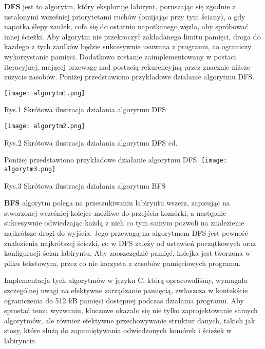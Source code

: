 \documentclass{article}
\begin{document}
\vspace{1mm}

\item \textbf{DFS} jest to algorytm, który eksploruje labirynt, poruszając się zgodnie z ustalonymi wcześniej priorytetami ruchów (omijając przy tym ściany), a gdy napotka ślepy zaułek, cofa się do ostatnio napotkanego węzła, aby spróbować innej ścieżki. Aby algorytm nie przekroczył zakładanego limitu pamięci, droga do każdego z tych zaułków będzie sukcesywnie usuwana z programu, co ograniczy wykorzystanie pamięci. Dodatkowo zostanie zaimplementowany w postaci iteracyjnej, mającej przewagę nad postacią rekurencyjną przez znacznie niższe zużycie zasobów. Poniżej przedstawiono przykładowe działanie algorytmu DFS.

\centering
\texttt{[image: algorytm1.png]}
\caption{Rys.1 Skrótowa ilustracja działania algorytmu DFS}
\restoregeometry

\texttt{[image: algorytm2.png]}
\caption{Rys.2 Skrótowa ilustracja działania algorytmu DFS cd.}
\restoregeometry

Poniżej przedstawiono przykładowe działanie algorytmu DFS.
\texttt{[image: algorytm3.png]}
\caption{Rys.3 Skrótowa ilustracja działania algorytmu BFS}
\restoregeometry

\flushleft

\item \textbf{BFS} algorytm polega na przeszukiwaniu labiryntu wszerz, zapisując na stworzonej wcześniej kolejce możliwe do przejścia komórki, a następnie sukcesywnie odwiedzając każdą z nich co tym samym pozwoli na znalezienie najkrótsze drogi do wyjścia. Jego przewagą na algorytmem DFS jest pewność znalezienia najkrótszej ścieżki, co w DFS zależy od ustawień początkowych oraz konfiguracji ścian labiryntu. Aby zaoszczędzić pamięć, kolejka jest tworzona w pliku tekstowym, przez co nie korzysta z zasobów pamięciowych programu.

\vspace{5mm}

Implementacja tych algorytmów w języku C, którą opracowaliśmy, wymagała szczególnej uwagi na efektywne zarządzanie pamięcią, zwłaszcza w kontekście ograniczenia do 512 kB pamięci dostępnej podczas działania programu. Aby sprostać temu wyzwaniu, kluczowe okazało się nie tylko zaprojektowanie samych algorytmów, ale również efektywne przechowywanie struktur danych, takich jak stosy, które służą do zapamiętywania odwiedzonych komórek i ścieżek w labiryncie.
\end{document}
